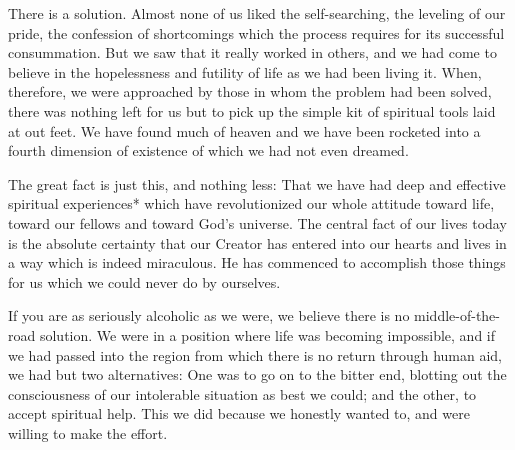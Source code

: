 \begin{biblechapter}
    There is a solution. 
\verse Almost none of us liked the self-searching, 
    the leveling of our pride, the confession of shortcomings 
    which the process requires for its successful consummation. 
\verse But we saw that it really worked in others, 
    and we had come to believe in the hopelessness 
    and futility of life as we had been living it. 
\verse When, therefore, 
    we were approached by those in whom the problem had been solved, 
    there was nothing left for us 
    but to pick up the simple kit of spiritual tools 
    laid at out feet. 
\verse We have found much of heaven 
    and we have been rocketed into a fourth dimension of existence 
    of which we had not even dreamed.

\verse The great fact is just this, and nothing less: 
\verse That we have had deep and effective spiritual experiences* 
    which have revolutionized our whole attitude toward life, 
    toward our fellows 
    and toward God's universe. 
\verse The central fact of our lives today is the absolute certainty 
    that our Creator has entered into our hearts and lives 
    in a way which is indeed miraculous. 
\verse He has commenced to accomplish those things for us 
    which we could never do by ourselves.

\verse If you are as seriously alcoholic as we were, 
    we believe there is no middle-of-the-road solution. 
\verse We were in a position where life was becoming impossible, 
    and if we had passed into the region from which 
    there is no return through human aid, 
    we had but two alternatives: 
\verse One was to go on to the bitter end, 
    blotting out the consciousness of our intolerable situation 
    as best we could; 
    and the other, to accept spiritual help. 
\verse This we did because we honestly wanted to, 
    and were willing to make the effort.
\end{biblechapter}


